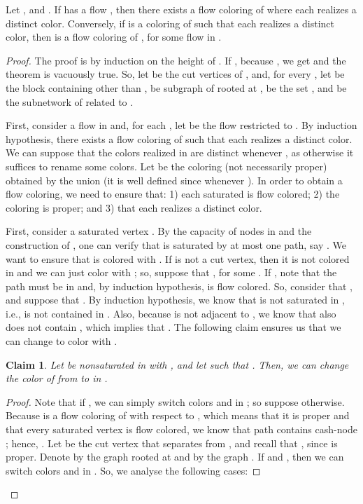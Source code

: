 \documentclass{llncs}
\newtheorem{claimnum}{Claim}
\begin{document}
\begin{theorem}\label{thm:flow}
Let , and . If  has a flow , then there exists a flow coloring  of  where each  realizes a distinct color. Conversely, if  is a coloring of  such that each  realizes a distinct color, then  is a flow coloring of , for some flow  in .
\end{theorem}
\begin{proof}
The proof is by induction on the height of . If , because , we get  and the theorem is vacuously true. So, let  be the cut vertices of , and, for every , let  be the block containing  other than ,  be subgraph of  rooted at ,  be the set , and  be the subnetwork of  related to . 

First, consider a flow  in  and, for each , let  be the flow  restricted to . By induction hypothesis, there exists a flow coloring  of  such that each  realizes a distinct color. We can suppose that the colors realized in  are distinct whenever , as otherwise it suffices to rename some colors. Let  be the coloring (not necessarily proper) obtained by the union  (it is well defined since  whenever ). In order to obtain a flow coloring, we need to ensure that: 1) each saturated  is flow colored; 2) the coloring is proper; and 3) that each  realizes a distinct color.
 
First, consider a saturated vertex . By the capacity of nodes in  and the construction of , one can verify that  is saturated by at most one path, say . We want to ensure that  is colored with . If  is not a cut vertex, then it is not colored in  and we can just color  with ; so, suppose that , for some . If , note that the path  must be in  and, by induction hypothesis,  is flow colored.
So, consider that , and suppose that . By induction hypothesis, we know that  is not saturated in , i.e.,  is not contained in . Also, because  is not adjacent to , we know that  also does not contain , which implies that . The following claim ensures us that we can change  to color  with .

\begin{claimnum}\label{claim1}
 Let  be nonsaturated in  with , and let  such that . Then, we can change the color of  from  to  in .
\end{claimnum}
\begin{proof}
Note that if , we can simply switch colors  and  in ; so suppose otherwise. Because  is a flow coloring of  with respect to , which means that it is proper and that every saturated vertex is flow colored, we know that path  contains cash-node ; hence, . Let  be the cut vertex that separates  from , and recall that , since  is proper. Denote by  the graph rooted at  and by  the graph . If  and , then we can switch colors  and  in . So, we analyse the following cases:


\end{proof}
\end{proof}
\end{document}
